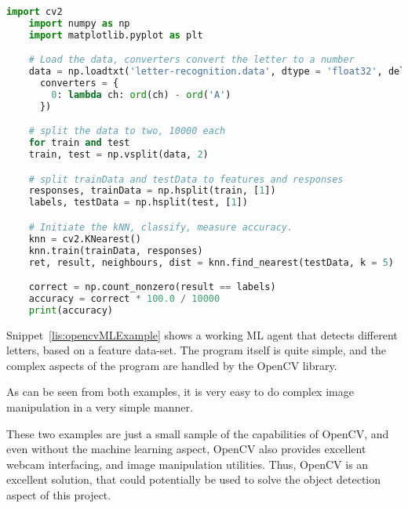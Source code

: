 \begin{lstlisting}[language=Python,label=lis:opencvMLExample,caption=Source code OpenCV documentation\cite{opencvMLexamples}.]
	import cv2
	import numpy as np
	import matplotlib.pyplot as plt

	# Load the data, converters convert the letter to a number
	data = np.loadtxt('letter-recognition.data', dtype = 'float32', delimiter = ',',
	  converters = {
	    0: lambda ch: ord(ch) - ord('A')
	  })

	# split the data to two, 10000 each
	for train and test
	train, test = np.vsplit(data, 2)

	# split trainData and testData to features and responses
	responses, trainData = np.hsplit(train, [1])
	labels, testData = np.hsplit(test, [1])

	# Initiate the kNN, classify, measure accuracy.
	knn = cv2.KNearest()
	knn.train(trainData, responses)
	ret, result, neighbours, dist = knn.find_nearest(testData, k = 5)

	correct = np.count_nonzero(result == labels)
	accuracy = correct * 100.0 / 10000
	print(accuracy)
\end{lstlisting}

Snippet~\ref{lis:opencvMLExample} shows a working ML agent that detects different letters, based on a feature data-set.
The program itself is quite simple, and the complex aspects of the program are handled by the OpenCV library.

As can be seen from both examples, it is very easy to do complex image manipulation in a very simple manner.

These two examples are just a small sample of the capabilities of OpenCV, and even without the machine learning aspect, OpenCV also provides excellent webcam interfacing, and image manipulation utilities.
Thus, OpenCV is an excellent solution, that could potentially be used to solve the object detection aspect of this project.



